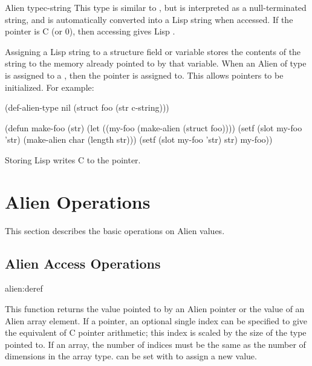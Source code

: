 \begin{deftp}{Alien type}{c-string}{}
  This type is similar to , but is interpreted as a
  null-terminated string, and is automatically converted into a Lisp
  string when accessed.  If the pointer is C  (or 0), then
  accessing gives Lisp \false.
  
  Assigning a Lisp string to a  structure field or
  variable stores the contents of the string to the memory already
  pointed to by that variable.  When an Alien of type 
  is assigned to a , then the  pointer
  is assigned to.  This allows  pointers to be
  initialized.  For example:

\begin{lisp}
  (def-alien-type nil (struct foo (str c-string)))
  
  (defun make-foo (str) (let ((my-foo (make-alien (struct foo))))
  (setf (slot my-foo 'str) (make-alien char (length str))) (setf (slot
  my-foo 'str) str) my-foo))
\end{lisp}

Storing Lisp \false{} writes C  to the 
pointer.
\end{deftp}



\section{Alien Operations}

This section describes the basic operations on Alien values.

\subsection{Alien Access Operations}

\begin{defun}{alien:}{deref}{}
  
  This function returns the value pointed to by an Alien pointer or
  the value of an Alien array element.  If a pointer, an optional
  single index can be specified to give the equivalent of C pointer
  arithmetic; this index is scaled by the size of the type pointed to.
  If an array, the number of indices must be the same as the number of
  dimensions in the array type.   can be set with
   to assign a new value.
\end{defun}
 
